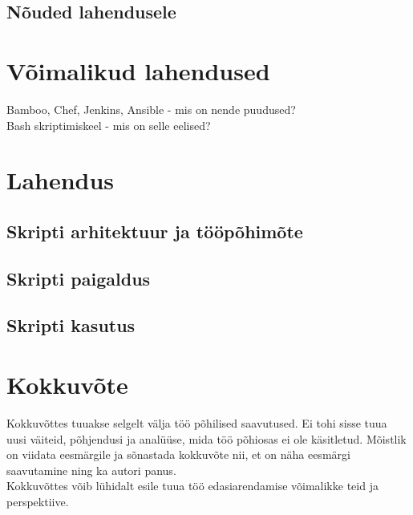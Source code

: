 \documentclass[12pt]{report}
\begin{document}
  
  \subsection{Nõuded lahendusele}
  
  \newpage
  
  \section{Võimalikud lahendused}
  Bamboo, Chef, Jenkins, Ansible - mis on nende puudused?\\
  Bash skriptimiskeel - mis on selle eelised?
  
  \newpage
  
  \section{Lahendus}
  
  \subsection{Skripti arhitektuur ja tööpõhimõte}
  
  \subsection{Skripti paigaldus}
  
  \subsection{Skripti kasutus}
  
  \newpage
  
  \section*{Kokkuvõte}
  \label{kokkuvote}

Kokkuvõttes tuuakse selgelt välja töö põhilised saavutused. Ei tohi sisse tuua uusi väiteid, põhjendusi ja analüüse, mida töö põhiosas ei ole käsitletud. Mõistlik on viidata eesmärgile ja sõnastada kokkuvõte nii, et on näha eesmärgi saavutamine ning ka autori panus.\\

Kokkuvõttes võib lühidalt esile tuua töö edasiarendamise võimalikke teid ja perspektiive.\\
\end{document}

